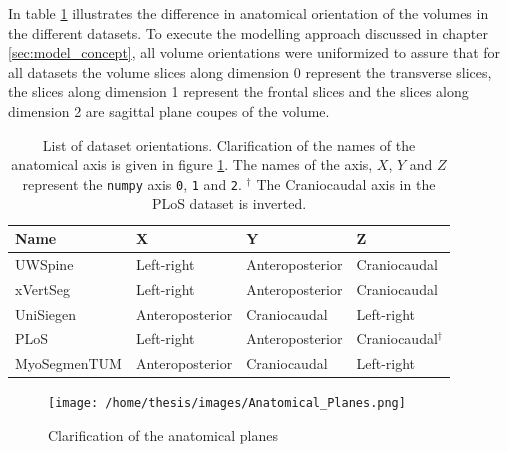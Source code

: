 In table \ref{tab:dataOrientation} illustrates the difference in anatomical orientation of the volumes in the different datasets.
To execute the modelling approach discussed in chapter \ref{sec:model_concept}, all volume orientations were uniformized to assure that for all datasets the volume slices along dimension 0 represent the transverse slices, 
the slices along dimension 1 represent the frontal slices and the slices along dimension 2 are sagittal plane coupes of the volume.

\begin{table}
 
    \begin{tabular}{ l l l l} 
     \hline
     \hline
     Name & X & Y & Z \\
     \hline 
    UWSpine & Left-right & Anteroposterior & Craniocaudal \\
    xVertSeg & Left-right & Anteroposterior & Craniocaudal \\
    UniSiegen  &  Anteroposterior & Craniocaudal & Left-right \\
    PLoS & Left-right & Anteroposterior & Craniocaudal$^\dagger$ \\
    MyoSegmenTUM &  Anteroposterior & Craniocaudal & Left-right \\
     \hline
     \hline
    \end{tabular}
    \caption{List of dataset orientations. Clarification of the names of the anatomical axis is given in figure \ref{fig:anatomicalPlains}.
    The names of the axis, $X$, $Y$ and $Z$ represent the \texttt{numpy} axis \texttt{0}, \texttt{1} and \texttt{2}.
    $^\dagger$ The Craniocaudal axis in the PLoS dataset is inverted.\label{tab:dataOrientation}}

\end{table}

\begin{figure}
    \centering
    \texttt{[image: /home/thesis/images/Anatomical\_Planes.png]}
    \caption{Clarification of the anatomical planes\label{fig:anatomicalPlains}}
  \end{figure}

